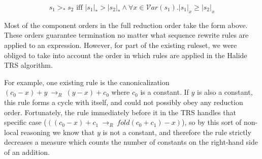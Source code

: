 \documentclass[acmsmall,review]{acmart}\settopmatter{printfolios=true,printccs=false,printacmref=false}
\newcommand{\rewrites}[0]{\:\rightarrow_{R}\:}
\begin{document}
\[
s_1 >_* s_2 \textrm{ iff } |s_1|_* > |s_2|_* \wedge \forall x \in \mathcal{V}ar(s_1) . |s_1|_x \geq |s_2|_x
\]

Most of the component orders in the full reduction order take the form above. These orders guarantee termination no matter what sequence rewrite rules are applied to an expression. However, for part of the existing ruleset, we were obliged to take into account the order in which rules are applied in the Halide TRS algorithm.

For example, one existing rule is the canonicalization $(c_0 - x) + y \rewrites (y - x) + c_0$ where $c_0$ is a constant. If $y$ is also a constant, this rule forms a cycle with itself, and could not possibly obey any reduction order. Fortunately, the rule immediately before it in the TRS handles that specific case ($((c_0 - x) + c_1 \rewrites fold(c_0 + c_1) - x)$), so by this sort of non-local reasoning we know that $y$ is not a constant, and therefore the rule strictly decreases a measure which counts the number of constants on the right-hand side of an addition.




\end{document}
